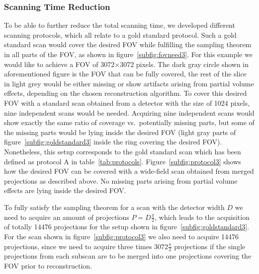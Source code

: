 \subsubsection{Scanning Time Reduction}%
To be able to further reduce the total scanning time, we developed different scanning protocols, which all relate to a gold standard protocol. Such a gold standard scan would cover the desired FOV while fulfilling the sampling theorem in all parts of the FOV, as shown in figure~\ref{subfig:fovneed3}. For this example we would like to achieve a FOV of 3072$\times$3072 pixels. The dark gray circle shown in aforementioned figure is the FOV that can be fully covered, the rest of the slice in light grey would be either missing or show artifacts arising from partial volume effects, depending on the chosen reconstruction algorithm. To cover this desired FOV with a standard scan obtained from a detector with the size of 1024 pixels, nine independent scans would be needed. Acquiring nine independent scans would show exactly the same ratio of coverage vs.\ potentially missing parts, but some of the missing parts would be lying inside the desired FOV (light gray parts of figure~\ref{subfig:goldstandard3} inside the ring covering the desired FOV). Nonetheless, this setup corresponds to the gold standard scan which has been defined as protocol A in table~\ref{tab:protocols}. Figure~\ref{subfig:protocol3} shows how the desired FOV can be covered with a wide-field scan obtained from merged projections as described above. No missing parts arising from partial volume effects are lying inside the desired FOV.

To fully satisfy the sampling theorem for a scan with the detector width $D$ we need to acquire an amount of projections $P=D\frac{\pi}{2}$, which leads to the acquisition of totally 14476 projections for the setup shown in figure~\ref{subfig:goldstandard3}. For the scan shown in figure~\ref{subfig:protocol3} we also need to acquire 14476 projections, since we need to acquire three times $3072\frac{\pi}{2}$ projections if the single projections from each subscan are to be merged into one projections covering the FOV prior to reconstruction.

